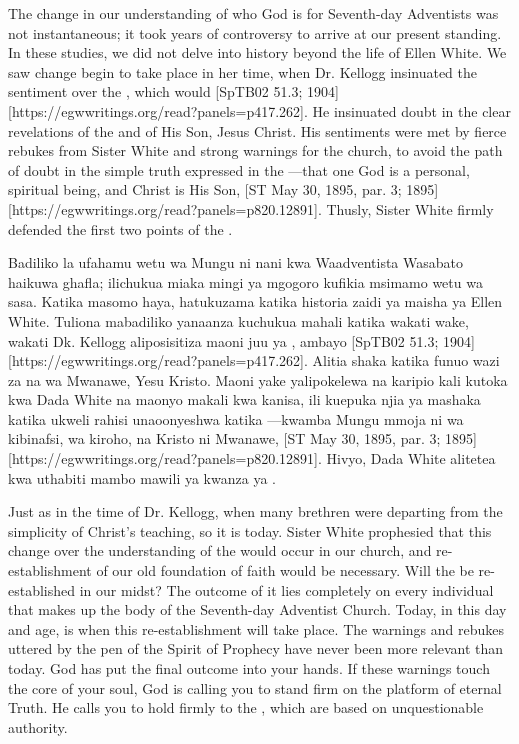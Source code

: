 The change in our understanding of who God is for Seventh-day Adventists was not instantaneous; it took years of controversy to arrive at our present standing. In these studies, we did not delve into history beyond the life of Ellen White. We saw change begin to take place in her time, when Dr. Kellogg insinuated the sentiment over the , which would [SpTB02 51.3; 1904][https://egwwritings.org/read?panels=p417.262]. He insinuated doubt in the clear revelations of the  and of His Son, Jesus Christ. His sentiments were met by fierce rebukes from Sister White and strong warnings for the church, to avoid the path of doubt in the simple truth expressed in the —that one God is a personal, spiritual being, and Christ is His Son, [ST May 30, 1895, par. 3; 1895][https://egwwritings.org/read?panels=p820.12891]. Thusly, Sister White firmly defended the first two points of the .


Badiliko la ufahamu wetu wa Mungu ni nani kwa Waadventista Wasabato haikuwa ghafla; ilichukua miaka mingi ya mgogoro kufikia msimamo wetu wa sasa. Katika masomo haya, hatukuzama katika historia zaidi ya maisha ya Ellen White. Tuliona mabadiliko yanaanza kuchukua mahali katika wakati wake, wakati Dk. Kellogg aliposisitiza maoni juu ya , ambayo [SpTB02 51.3; 1904][https://egwwritings.org/read?panels=p417.262]. Alitia shaka katika funuo wazi za  na wa Mwanawe, Yesu Kristo. Maoni yake yalipokelewa na karipio kali kutoka kwa Dada White na maonyo makali kwa kanisa, ili kuepuka njia ya mashaka katika ukweli rahisi unaoonyeshwa katika —kwamba Mungu mmoja ni wa kibinafsi, wa kiroho, na Kristo ni Mwanawe, [ST May 30, 1895, par. 3; 1895][https://egwwritings.org/read?panels=p820.12891]. Hivyo, Dada White alitetea kwa uthabiti mambo mawili ya kwanza ya .


Just as in the time of Dr. Kellogg, when many brethren were departing from the simplicity of Christ’s teaching, so it is today. Sister White prophesied that this change over the understanding of the  would occur in our church, and re-establishment of our old foundation of faith would be necessary. Will the  be re-established in our midst? The outcome of it lies completely on every individual that makes up the body of the Seventh-day Adventist Church. Today, in this day and age, is when this re-establishment will take place. The warnings and rebukes uttered by the pen of the Spirit of Prophecy have never been more relevant than today. God has put the final outcome into your hands. If these warnings touch the core of your soul, God is calling you to stand firm on the platform of eternal Truth. He calls you to hold firmly to the , which are based on unquestionable authority.



